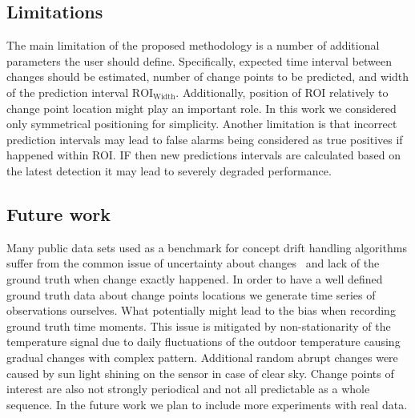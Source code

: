 \subsection{Limitations}
The main limitation of the proposed methodology is a number of additional parameters the user should define.
Specifically, expected time interval between changes should be estimated, number of change points to be predicted, and width of the prediction interval $\text{ROI}_{\text{Width}}$.
Additionally, position of ROI relatively to change point location might play an important role. In this work we considered only symmetrical positioning for simplicity.
Another limitation is that incorrect prediction intervals may lead to false alarms being considered as true positives if happened within ROI. IF then new predictions intervals are calculated based on the latest detection it may lead to severely degraded performance. 

\subsection{Future work}
Many public data sets used as a benchmark for concept drift handling algorithms suffer from the common issue of uncertainty about changes~\cite{SouzaRMB20} and lack of the ground truth when change exactly happened. 
In order to have a well defined ground truth data about change points locations we generate time series of observations ourselves.
What potentially might lead to the bias when recording ground truth time moments.
This issue is mitigated by non-stationarity of the temperature signal due to daily fluctuations of the outdoor temperature causing gradual changes with complex pattern.
Additional random abrupt changes were caused by sun light shining on the sensor in case of clear sky. Change points of interest are also not strongly periodical and not all predictable as a whole sequence.
In the future work we plan to include more experiments with real data. 

